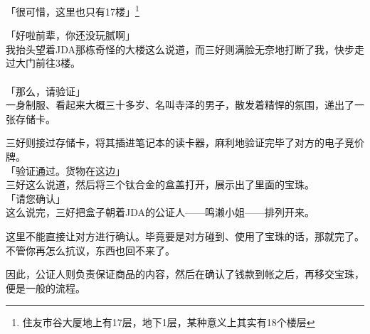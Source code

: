 「很可惜，这里也只有17楼」\footnote{住友市谷大厦地上有17层，地下1层，某种意义上其实有18个楼层}

「好啦前辈，你还没玩腻啊」\\

我抬头望着JDA那栋奇怪的大楼这么说道，而三好则满脸无奈地打断了我，快步走过大门前往3楼。\\

\sqsplit\\

「那么，请验证」\\

一身制服、看起来大概三十多岁、名叫寺泽的男子，散发着精悍的氛围，递出了一张存储卡。

三好则接过存储卡，将其插进笔记本的读卡器，麻利地验证完毕了对方的电子竞价牌。\\

「验证通过。货物在这边」\\

三好这么说道，然后将三个钛合金的盒盖打开，展示出了里面的宝珠。\\

「请您确认」\\

这么说完，三好把盒子朝着JDA的公证人——鸣濑小姐——排列开来。

这里不能直接让对方进行确认。毕竟要是对方碰到、使用了宝珠的话，那就完了。不管你再怎么抗议，东西也回不来了。

因此，公证人则负责保证商品的内容，然后在确认了钱款到帐之后，再移交宝珠，便是一般的流程。\\

